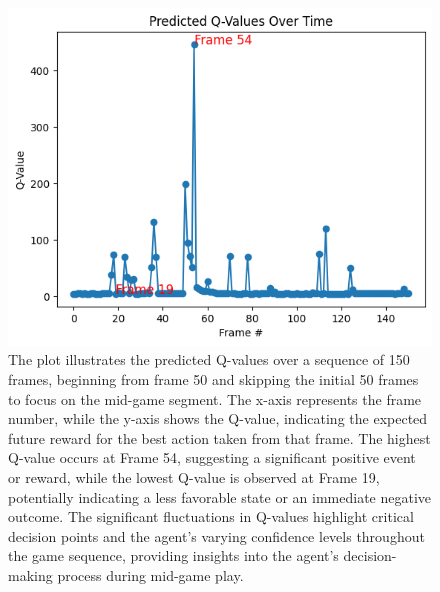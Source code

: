 \begin{figure}
    \centering
    \includegraphics[width=0.8\linewidth]{graphics/q-values.png}
    \caption{The plot illustrates the predicted Q-values over a sequence of 150 frames, beginning from frame 50 and skipping the initial 50 frames to focus on the mid-game segment. The x-axis represents the frame number, while the y-axis shows the Q-value, indicating the expected future reward for the best action taken from that frame. The highest Q-value occurs at Frame 54, suggesting a significant positive event or reward, while the lowest Q-value is observed at Frame 19, potentially indicating a less favorable state or an immediate negative outcome. The significant fluctuations in Q-values highlight critical decision points and the agent's varying confidence levels throughout the game sequence, providing insights into the agent's decision-making process during mid-game play.}
    \label{fig: q-values}
\end{figure}

